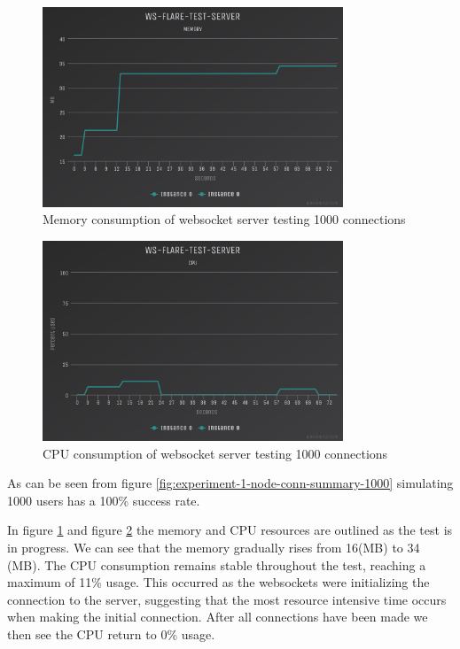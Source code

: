 \begin{figure}[H]
  \centering
    \includegraphics[width=0.8\textwidth]{figures/experiments/experiment-1/node-js/memory-1000.png}
    \caption{Memory consumption of websocket server testing 1000 connections}
    \label{fig:experiment-1-node-memory-1000}
\end{figure}

\begin{figure}[H]
  \centering
    \includegraphics[width=0.8\textwidth]{figures/experiments/experiment-1/node-js/cpu-1000.png}
    \caption{CPU consumption of websocket server testing 1000 connections}
    \label{fig:experiment-1-node-cpu-1000}
\end{figure}

As can be seen from figure \ref{fig:experiment-1-node-conn-summary-1000} simulating 1000 users has a 100\% success rate.

In figure \ref{fig:experiment-1-node-memory-1000} and figure \ref{fig:experiment-1-node-cpu-1000} the memory and CPU resources are outlined as the test is in progress. We can see that the memory gradually rises from 16(MB) to 34 (MB). The CPU consumption remains stable throughout the test, reaching a maximum of 11\% usage. This occurred as the websockets were initializing the connection to the server, suggesting that the most resource intensive time occurs when making the initial connection. After all connections have been made we then see the CPU return to 0\% usage. 

